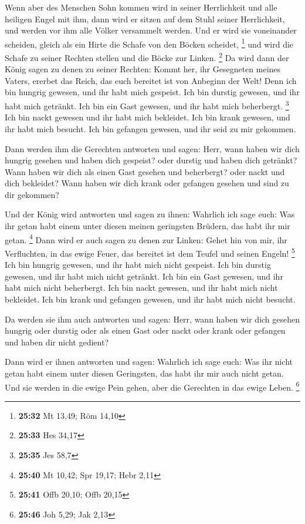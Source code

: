  Wenn aber des Menschen Sohn kommen wird in seiner
Herrlichkeit und alle heiligen Engel mit ihm, dann wird er sitzen auf
dem Stuhl seiner Herrlichkeit,  und werden vor ihm alle
Völker versammelt werden. Und er wird sie voneinander scheiden, gleich
als ein Hirte die Schafe von den Böcken scheidet, \footnote{\textbf{25:32}
  Mt 13,49; Röm 14,10}  und wird die Schafe zu seiner
Rechten stellen und die Böcke zur Linken. \footnote{\textbf{25:33} Hes
  34,17}  Da wird dann der König sagen zu denen zu seiner
Rechten: Kommt her, ihr Gesegneten meines Vaters, ererbet das Reich, das
euch bereitet ist von Anbeginn der Welt!  Denn ich bin
hungrig gewesen, und ihr habt mich gespeist. Ich bin durstig gewesen,
und ihr habt mich getränkt. Ich bin ein Gast gewesen, und ihr habt mich
beherbergt. \footnote{\textbf{25:35} Jes 58,7}  Ich bin
nackt gewesen und ihr habt mich bekleidet. Ich bin krank gewesen, und
ihr habt mich besucht. Ich bin gefangen gewesen, und ihr seid zu mir
gekommen.

 Dann werden ihm die Gerechten antworten und sagen: Herr,
wann haben wir dich hungrig gesehen und haben dich gespeist? oder
durstig und haben dich getränkt?  Wann haben wir dich als
einen Gast gesehen und beherbergt? oder nackt und dich bekleidet?
 Wann haben wir dich krank oder gefangen gesehen und sind
zu dir gekommen?

 Und der König wird antworten und sagen zu ihnen:
Wahrlich ich sage euch: Was ihr getan habt einem unter diesen meinen
geringsten Brüdern, das habt ihr mir getan. \footnote{\textbf{25:40} Mt
  10,42; Spr 19,17; Hebr 2,11}  Dann wird er auch sagen
zu denen zur Linken: Gehet hin von mir, ihr Verfluchten, in das ewige
Feuer, das bereitet ist dem Teufel und seinen Engeln! \footnote{\textbf{25:41}
  Offb 20,10; Offb 20,15}  Ich bin hungrig gewesen, und
ihr habt mich nicht gespeist. Ich bin durstig gewesen, und ihr habt mich
nicht getränkt.  Ich bin ein Gast gewesen, und ihr habt
mich nicht beherbergt. Ich bin nackt gewesen, und ihr habt mich nicht
bekleidet. Ich bin krank und gefangen gewesen, und ihr habt mich nicht
besucht.

 Da werden sie ihm auch antworten und sagen: Herr, wann
haben wir dich gesehen hungrig oder durstig oder als einen Gast oder
nackt oder krank oder gefangen und haben dir nicht gedient?

 Dann wird er ihnen antworten und sagen: Wahrlich ich
sage euch: Was ihr nicht getan habt einem unter diesen Geringsten, das
habt ihr mir auch nicht getan.  Und sie werden in die
ewige Pein gehen, aber die Gerechten in das ewige Leben. \footnote{\textbf{25:46}
  Joh 5,29; Jak 2,13}

